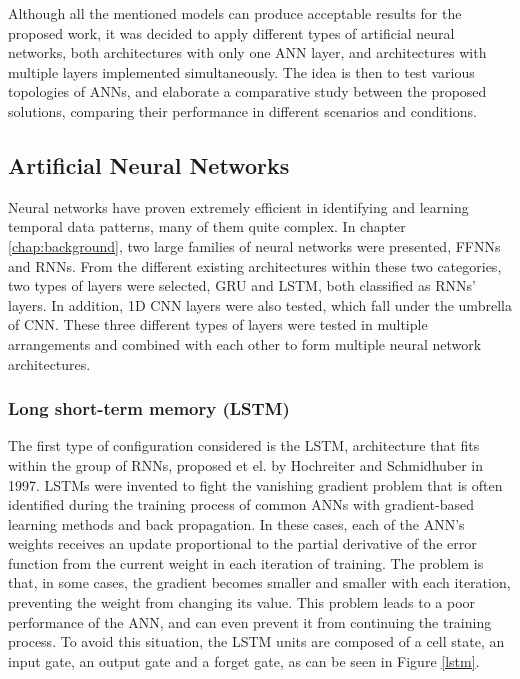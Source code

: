Although all the mentioned models can produce acceptable results for the proposed work, it was decided to apply different types of artificial neural networks, both architectures with only one \ac{ANN} layer, and architectures with multiple layers implemented simultaneously. The idea is then to test various topologies of \ac{ANN}s, and elaborate a comparative study between the proposed solutions, comparing their performance in different scenarios and conditions.

\subsection{Artificial Neural Networks}\label{chap3:subsec:artificial_neural_networks}

Neural networks have proven extremely efficient in identifying and learning temporal data patterns, many of them quite complex. In chapter \ref{chap:background}, two large families of neural networks were presented, \ac{FFNN}s and \ac{RNN}s. From the different existing architectures within these two categories, two types of layers were selected, \ac{GRU} and \ac{LSTM}, both classified as \ac{RNN}s' layers. In addition, \ac{1D CNN} layers were also tested, which fall under the umbrella of \ac{CNN}. These three different types of layers were tested in multiple arrangements and combined with each other to form multiple neural network architectures.

\subsubsection{Long short-term memory (LSTM)}\label{chap3:subsubsec:lstm}

The first type of configuration considered is the \ac{LSTM}, architecture that fits within the group of \ac{RNN}s, proposed et el. \cite{lstm0} by Hochreiter and Schmidhuber in 1997. \ac{LSTM}s were invented to fight the vanishing gradient problem that is often identified during the training process of common \ac{ANN}s with gradient-based learning methods and back propagation. In these cases, each of the \ac{ANN}'s weights receives an update proportional to the partial derivative of the error function from the current weight in each iteration of training. The problem is that, in some cases, the gradient becomes smaller and smaller with each iteration, preventing the weight from changing its value. This problem leads to a poor performance of the \ac{ANN}, and can even prevent it from continuing the training process. To avoid this situation, the \ac{LSTM} units are composed of a cell state, an input gate, an output gate and a forget gate, as can be seen in Figure \ref{lstm}.

